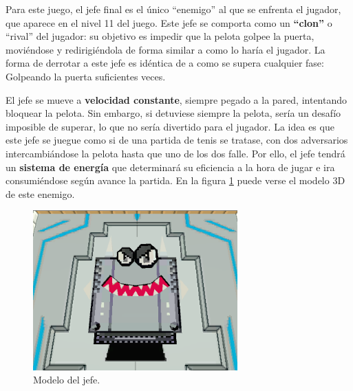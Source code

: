 Para este juego, el jefe final es el único ``enemigo'' al que se enfrenta el jugador, que aparece en el nivel 11 del juego. Este jefe se comporta como un \textbf{``clon''} o ``rival'' del jugador: su objetivo es impedir que la pelota golpee la puerta, moviéndose y redirigiéndola de forma similar a como lo haría el jugador. La forma de derrotar a este jefe es idéntica de a como se supera cualquier fase: Golpeando la puerta suficientes veces. 

El jefe se mueve a \textbf{velocidad constante}, siempre pegado a la pared, intentando bloquear la pelota. Sin embargo, si detuviese siempre la pelota, sería un desafío imposible de superar, lo que no sería divertido para el jugador. La idea es que este jefe se juegue como si de una partida de tenis se tratase, con dos adversarios intercambiándose la pelota hasta que uno de los dos falle. Por ello, el jefe tendrá un \textbf{sistema de energía} que determinará su eficiencia a la hora de jugar e ira consumiéndose según avance la partida. En la figura \ref{boss} puede verse el modelo 3D de este enemigo.
\begin{figure}[h]
	\includegraphics[width=0.70\textwidth]{images/estructura/jefe/boss-captura}
	\centering
	\caption{Modelo del jefe.}
	\label{boss}
\end{figure}

